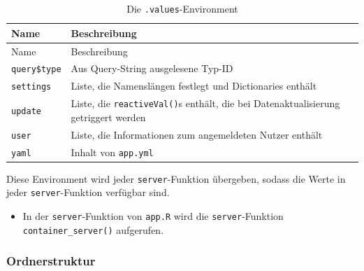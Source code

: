 \documentclass[
]{article}
\providecommand{\tightlist}{%
  \setlength{\itemsep}{0pt}\setlength{\parskip}{0pt}}
\begin{document}
\begin{longtable}[]{@{}
  >{\raggedright\arraybackslash}p{}
  >{\raggedright\arraybackslash}p{}@{}}
\caption{\label{tab:values-environment} Die \texttt{.values}-Environment}\tabularnewline
\toprule
Name & Beschreibung \\
\midrule
\endfirsthead
\toprule
Name & Beschreibung \\
\midrule
\endhead
\texttt{query\$type} & Aus Query-String ausgelesene Typ-ID \\
\texttt{settings} & Liste, die Namenslängen festlegt und Dictionaries enthält \\
\texttt{update} & Liste, die \texttt{reactiveVal()}s enthält, die bei Datenaktualisierung getriggert werden \\
\texttt{user} & Liste, die Informationen zum angemeldeten Nutzer enthält \\
\texttt{yaml} & Inhalt von \texttt{app.yml} \\
\bottomrule
\end{longtable}

Diese Environment wird jeder \texttt{server}-Funktion übergeben, sodass die Werte in jeder \texttt{server}-Funktion verfügbar sind.

\begin{itemize}
\tightlist
\item
  In der \texttt{server}-Funktion von \texttt{app.R} wird die \texttt{server}-Funktion \texttt{container\_server()} aufgerufen.
\end{itemize}

\hypertarget{ordnerstruktur}{%
\subsubsection{Ordnerstruktur}\label{ordnerstruktur}}
\end{document}
